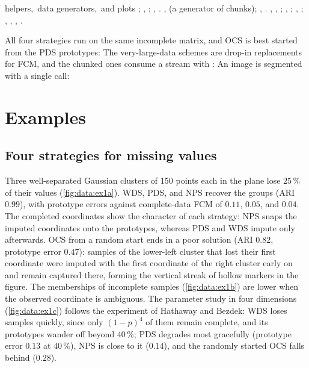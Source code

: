 \begin{apibox}{helpers,\allowbreak\ data generators,\allowbreak\ and plots}
; , ; , . ,  (a generator of chunks); , . , , ; , ; , ; , , , .
\end{apibox}

All four strategies run on the same incomplete matrix, and OCS is best started from the PDS prototypes:
The very-large-data schemes are drop-in replacements for FCM, and the chunked ones consume a stream with :
An image is segmented with a single call:

\section{Examples}\label{sec:data:examples}

\subsection{Four strategies for missing values}

Three well-separated Gaussian clusters of 150 points each in the plane lose $25\,\%$ of their values (\cref{fig:data:ex1a}). WDS, PDS, and NPS recover the groups (ARI $0.99$), with prototype errors against complete-data FCM of $0.11$, $0.05$, and $0.04$. The completed coordinates show the character of each strategy: NPS snaps the imputed coordinates onto the prototypes, whereas PDS and WDS impute only afterwards. OCS from a random start ends in a poor solution (ARI $0.82$, prototype error $0.47$): samples of the lower-left cluster that lost their first coordinate were imputed with the first coordinate of the right cluster early on and remain captured there, forming the vertical streak of hollow markers in the figure. The memberships of incomplete samples (\cref{fig:data:ex1b}) are lower when the observed coordinate is ambiguous. The parameter study in four dimensions (\cref{fig:data:ex1c}) follows the experiment of Hathaway and Bezdek: WDS loses samples quickly, since only $(1-p)^4$ of them remain complete, and its prototypes wander off beyond $40\,\%$; PDS degrades most gracefully (prototype error $0.13$ at $40\,\%$), NPS is close to it ($0.14$), and the randomly started OCS falls behind ($0.28$).

